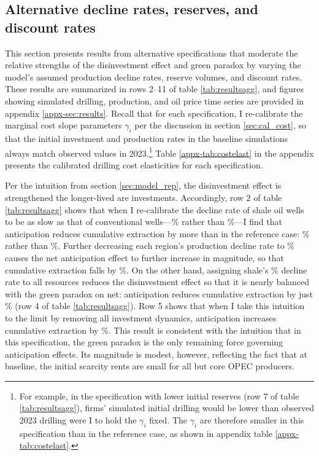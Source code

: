 \documentclass[12pt]{article}
\begin{document}
\subsection{Alternative decline rates, reserves, and discount rates} \label{sec:results_alt1}

This section presents results from alternative specifications that moderate the relative strengths of the disinvestment effect and green paradox by varying the model's assumed production decline rates, reserve volumes, and discount rates. These results are summarized in rows 2--11 of table \ref{tab:resultsagg}, and figures showing simulated drilling, production, and oil price time series are provided in appendix \ref{appx-sec:results}. Recall that for each specification, I re-calibrate the marginal cost slope parameters $\gamma_i$ per the discussion in section \ref{sec:cal_cost}, so that the initial investment and production rates in the baseline simulations always match observed values in 2023.\footnote{For example, in the specification with lower initial reserves (row 7 of table \ref{tab:resultsagg}), firms' simulated initial drilling would be lower than observed 2023 drilling were I to hold the $\gamma_i$ fixed. The $\gamma_i$ are therefore smaller in this specification than in the reference case, as shown in appendix table \ref{appx-tab:costelast}.} Table \ref{appx-tab:costelast} in the appendix presents the calibrated drilling cost elasticities for each specification.

Per the intuition from section \ref{sec:model_rep}, the disinvestment effect is strengthened the longer-lived are investments. Accordingly, row 2 of table \ref{tab:resultsagg} shows that when I re-calibrate the decline rate of shale oil wells to be as slow as that of conventional wells---\unskip\% rather than \unskip\%---I find that anticipation reduces cumulative extraction by more than in the reference case: \unskip\% rather than \unskip\%. Further decreasing each region's production decline rate to \unskip\% causes the net anticipation effect to further increase in magnitude, so that cumulative extraction falls by \unskip\%. On the other hand, assigning shale's \unskip\% decline rate to all resources reduces the disinvestment effect so that it is nearly balanced with the green paradox on net: anticipation reduces cumulative extraction by just \unskip\% (row 4 of table \ref{tab:resultsagg}). Row 5 shows that when I take this intuition to the limit by removing all investment dynamics, anticipation increases cumulative extraction by \unskip\%. This result is consistent with the intuition that in this specification, the green paradox is the only remaining force governing anticipation effects. Its magnitude is modest, however, reflecting the fact that at baseline, the initial scarcity rents are small for all but core OPEC producers.
\end{document}
